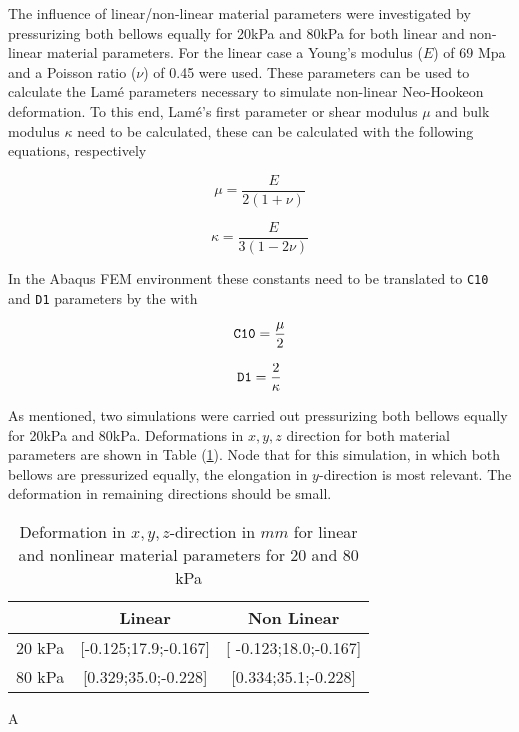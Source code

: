 The influence of linear/non-linear material parameters were investigated by pressurizing both bellows equally for 20kPa and 80kPa for both linear and non-linear material parameters. For the linear case a Young's modulus ($E$) of 69 Mpa and a Poisson ratio ($\nu$) of 0.45 were used. These parameters can be used to calculate the Lamé parameters necessary to simulate non-linear Neo-Hookeon deformation. To this end, Lamé's first parameter or shear modulus $\mu$ and bulk modulus $\kappa$ need to be calculated, these can be calculated with the following equations, respectively

\begin{equation}
    \mu = \frac{E}{2(1+\nu)}
\end{equation}


\begin{equation}
    \kappa = \frac{E}{3(1-2\nu)}
\end{equation}

In the Abaqus FEM environment these constants need to be translated to \verb+C10+ and \verb+D1+ parameters by the with

\begin{equation}
    \verb+C10+ = \frac{\mu}{2}
\end{equation}


\begin{equation}
    \verb+D1+ = \frac{2}{\kappa}
\end{equation}

As mentioned, two simulations were carried out pressurizing both bellows equally for 20kPa and 80kPa. Deformations in $x,y,z$ direction for both material parameters are shown in Table (\ref{tab2:linnonlindef}). Node that for this simulation, in which both bellows are pressurized equally, the elongation in $y$-direction is most relevant. The deformation in remaining directions should be small.

\begin{table}[H]
    \centering
    \begin{tabular}{|c|c|c|}  \hline
    & \textbf{Linear}    &  \textbf{Non Linear}    \\ \hline
      [x;y;z] 20 kPa   &  [-0.125;17.9;-0.167]     &         [ -0.123;18.0;-0.167]           \\ \hline
     [ x,y,z] 80 kPa   &  [0.329;35.0;-0.228]    &       [0.334;35.1;-0.228]             \\ \hline
    \end{tabular}
    \caption{Deformation in  $x,y,z$-direction in $mm$ for linear and nonlinear material parameters for 20 and 80 kPa}
    \label{tab2:linnonlindef}
\end{table}

A